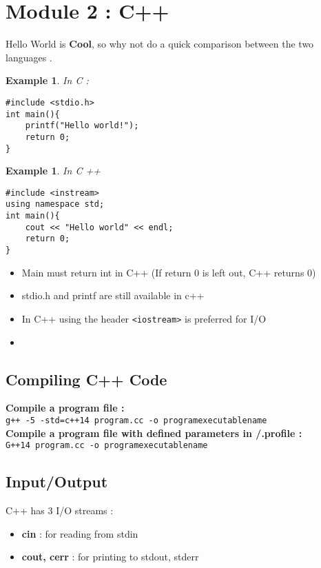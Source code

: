 \documentclass{article}
\newtheorem{ex}[theorem]{Example}
\newenvironment{ablock}[1]{%
    \tcolorbox[beamer,%
    noparskip,breakable,
    colback=lightcoral,colframe=darkred,%
    colbacklower=tomato!75!lightcoral,%
    title=#1]}%
    {\endtcolorbox}
\begin{document}
\section{Module 2 : C++}

Hello World is \textbf{Cool}, so why not do a quick comparison between the two languages .

\begin{ex} In C : 
\begin{lstlisting}
#include <stdio.h>
int main(){
	printf("Hello world!");
	return 0;
}
\end{lstlisting}
\end{ex}

\begin{ex} In C ++
\begin{lstlisting}
#include <instream>
using namespace std;
int main(){
	cout << "Hello world" << endl;
	return 0;
}
\end{lstlisting}
\end{ex}

\begin{ablock}{Notes}
\begin{itemize}
\item Main must return int in C++ (If return 0 is left out, C++ returns 0)
\item stdio.h and printf are still available in c++
\item In C++ using the header \verb|<iostream>| is preferred for I/O 
\item 
\end{itemize}
\end{ablock}

\subsection{Compiling C++ Code}

\textbf{Compile a program file : }\\
 \verb|g++ -5 -std=c++14 program.cc -o programexecutablename| \\
 
\textbf{Compile  a program file with defined parameters in /.profile : }\\
 \verb|G++14 program.cc -o programexecutablename|
 
 \subsection{Input/Output}
 
 C++ has 3 I/O streams :
 \begin{itemize}
 \item \textbf{cin} : for reading from stdin
 \item \textbf{cout, cerr} : for printing to stdout, stderr
 \end{itemize}
 
\end{document}
